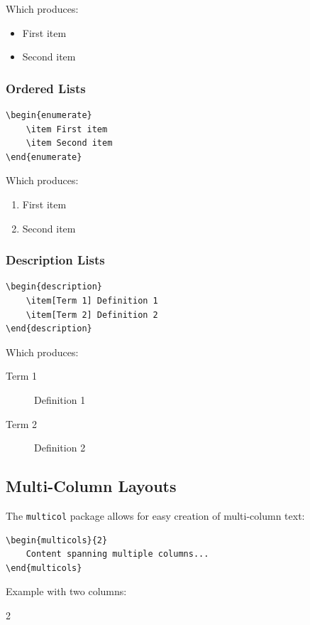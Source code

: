 Which produces:
\begin{itemize}
    \item First item
    \item Second item
\end{itemize}

\subsubsection{Ordered Lists}\label{subsubsec:ordered-lists}
\begin{verbatim}
\begin{enumerate}
    \item First item
    \item Second item
\end{enumerate}
\end{verbatim}

Which produces:
\begin{enumerate}
    \item First item
    \item Second item
\end{enumerate}

\subsubsection{Description Lists}\label{subsubsec:description-lists}
\begin{verbatim}
\begin{description}
    \item[Term 1] Definition 1
    \item[Term 2] Definition 2
\end{description}
\end{verbatim}

Which produces:
\begin{description}
    \item[Term 1] Definition 1
    \item[Term 2] Definition 2
\end{description}

\subsection{Multi-Column Layouts}\label{subsec:multi-column-layouts}
The \texttt{multicol} package allows for easy creation of multi-column text:

\begin{verbatim}
\begin{multicols}{2}
    Content spanning multiple columns...
\end{multicols}
\end{verbatim}

Example with two columns:
\begin{multicols}{2}
    \lipsum[1]
\end{multicols}